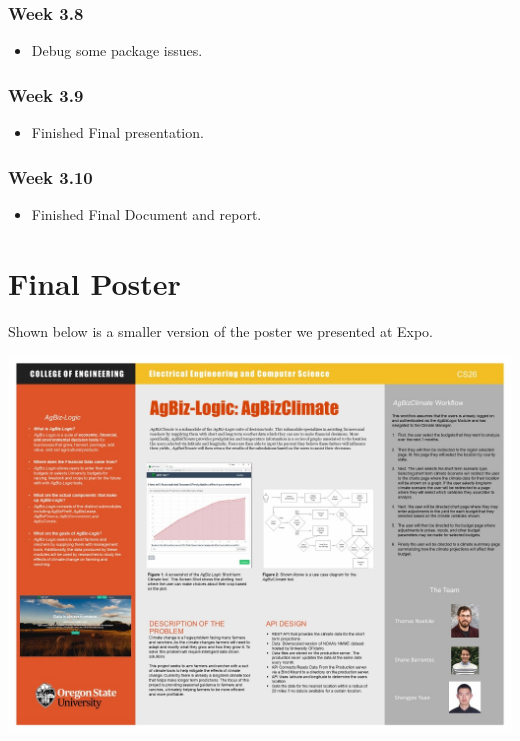 \documentclass[onecolumn, draftclsnofoot,10pt, compsoc]{article}
\begin{document}
					\subsubsection{Week 3.8}
						\begin{itemize}
						\item Debug some package issues.
						\end{itemize}
					\subsubsection{Week 3.9}
						\begin{itemize}
						\item Finished Final presentation.
						\end{itemize}
					\subsubsection{Week 3.10}
						\begin{itemize}
						\item Finished Final Document and report.
						\end{itemize}
						
\newpage
\section{Final Poster}
    Shown below is a smaller version of the poster we presented at Expo.\\
    \begin{landscape}
        \includegraphics[width=22cm]{./Images/ExpoPosterGroup26.jpg}
    \end{landscape}
%
\end{document}
